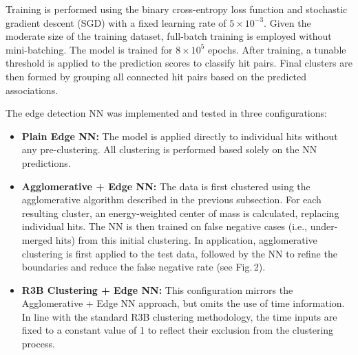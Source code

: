 \documentclass[final,5p,times,twocolumn]{elsarticle}
\begin{document}
Training is performed using the binary cross-entropy loss function\cite{mannor2005cross}\cite{de2005tutorial} and stochastic gradient descent (SGD)\cite{newton2018recent} with a fixed learning rate of $5 \times 10^{-3}$. Given the moderate size of the training dataset, full-batch training is employed without mini-batching. The model is trained for $8 \times 10^5$ epochs. After training, a tunable threshold is applied to the prediction scores to classify hit pairs. Final clusters are then formed by grouping all connected hit pairs based on the predicted associations.

The edge detection NN was implemented and tested in three configurations:

\begin{itemize}
    \item \textbf{Plain Edge NN:} The model is applied directly to individual hits without any pre-clustering. All clustering is performed based solely on the NN predictions.

    \item \textbf{Agglomerative + Edge NN:} The data is first clustered using the agglomerative algorithm described in the previous subsection. For each resulting cluster, an energy-weighted center of mass is calculated, replacing individual hits. The NN is then trained on false negative cases (i.e., under-merged hits) from this initial clustering. In application, agglomerative clustering is first applied to the test data, followed by the NN to refine the boundaries and reduce the false negative rate (see Fig.\,2).

    \item \textbf{R3B Clustering + Edge NN:} This configuration mirrors the Agglomerative + Edge NN approach, but omits the use of time information. In line with the standard R3B clustering methodology, the time inputs are fixed to a constant value of 1 to reflect their exclusion from the clustering process.
\end{itemize}
\end{document}
